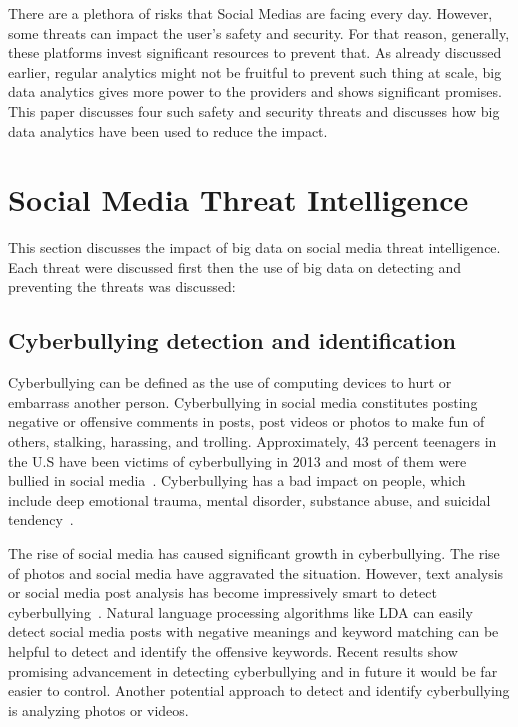 \documentclass[sigconf]{acmart}
\begin{document}
There are a plethora of risks that Social Medias are facing every day. However, some threats can impact the user's safety and security. For that reason, generally, these platforms invest significant resources to prevent that. As already discussed earlier, regular analytics might not be fruitful to prevent such thing at scale, big data analytics gives more power to the providers and shows significant promises. This paper discusses four such safety and security threats and discusses how big data analytics have been used to reduce the impact. 

\section{Social Media Threat Intelligence}
This section discusses the impact of big data on social media threat intelligence. Each threat were discussed first then the use of big data on detecting and preventing the threats was discussed:

\subsection{Cyberbullying detection and identification}
Cyberbullying can be defined as the use of computing devices to hurt or embarrass another person.  Cyberbullying in social media constitutes posting negative or offensive comments in posts, post videos or photos to make fun of others,  stalking, harassing, and trolling.  Approximately, 43 percent teenagers in the U.S have been victims of cyberbullying in 2013 and most of them were bullied in social media~\cite{cyberbullying}. Cyberbullying has a bad impact on people, which include deep emotional trauma, mental disorder, substance abuse, and suicidal tendency~\cite{cb-effect}. 

The rise of social media has caused significant growth in cyberbullying. The rise of photos and social media have aggravated the situation. However, text analysis or social media post analysis has become impressively smart to detect cyberbullying~\cite{HosseinmardiMRH15}. Natural language processing algorithms like LDA can easily detect social media posts with negative meanings and keyword matching can be helpful to detect and identify the offensive keywords. Recent results show promising advancement in detecting cyberbullying and in future it would be far easier to control. Another potential approach to detect and identify cyberbullying is analyzing photos or videos.
\end{document}
